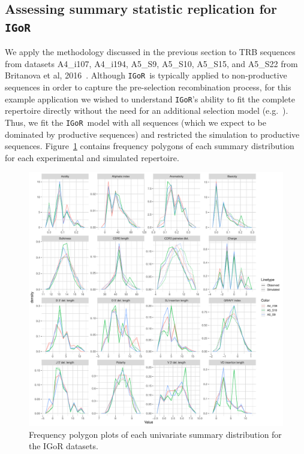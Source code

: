 \documentclass{article}
\newcommand{\igor}{\texttt{IGoR}}
\begin{document}
\subsection*{Assessing summary statistic replication for \igor}
We apply the methodology discussed in the previous section to TRB sequences from datasets A4\_i107, A4\_i194, A5\_S9, A5\_S10, A5\_S15, and A5\_S22 from Britanova et al, 2016~\cite{Britanova2016-iw}.
Although \igor\ is typically applied to non-productive sequences in order to capture the pre-selection recombination process, for this example application we wished to understand \igor's ability to fit the complete repertoire directly without the need for an additional selection model (e.g.\ \cite{Elhanati2014-mf}).
Thus, we fit the \igor\ model with all sequences (which we expect to be dominated by productive sequences) and restricted the simulation to productive sequences.
Figure~\ref{fig:IgorFreqPolys} contains frequency polygons of each summary distribution for each experimental and simulated repertoire.
\begin{figure}
    \includegraphics[width=\linewidth]{Figures/IgorScores/igor_freqpoly.pdf}
    \caption{Frequency polygon plots of each univariate summary distribution for the IGoR datasets.}
    \label{fig:IgorFreqPolys}
\end{figure}
\end{document}
